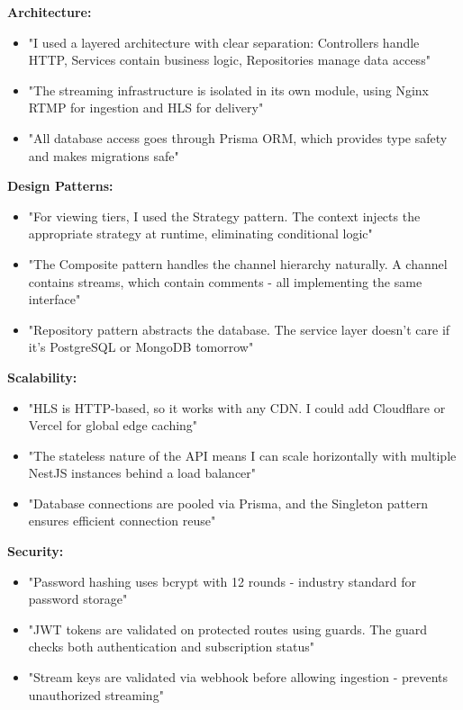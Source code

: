 \documentclass[10pt]{article}
\begin{document}
\noindent
\begin{tcolorbox}[
  colback=white,
  colframe=primary,
  arc=3pt,
  boxrule=1pt,
  before skip=8pt,
  after skip=8pt
]

\textbf{Architecture:}
\begin{itemize}
\item "I used a layered architecture with clear separation: Controllers handle HTTP, Services contain business logic, Repositories manage data access"
\item "The streaming infrastructure is isolated in its own module, using Nginx RTMP for ingestion and HLS for delivery"
\item "All database access goes through Prisma ORM, which provides type safety and makes migrations safe"
\end{itemize}

\textbf{Design Patterns:}
\begin{itemize}
\item "For viewing tiers, I used the Strategy pattern. The context injects the appropriate strategy at runtime, eliminating conditional logic"
\item "The Composite pattern handles the channel hierarchy naturally. A channel contains streams, which contain comments - all implementing the same interface"
\item "Repository pattern abstracts the database. The service layer doesn't care if it's PostgreSQL or MongoDB tomorrow"
\end{itemize}

\textbf{Scalability:}
\begin{itemize}
\item "HLS is HTTP-based, so it works with any CDN. I could add Cloudflare or Vercel for global edge caching"
\item "The stateless nature of the API means I can scale horizontally with multiple NestJS instances behind a load balancer"
\item "Database connections are pooled via Prisma, and the Singleton pattern ensures efficient connection reuse"
\end{itemize}

\textbf{Security:}
\begin{itemize}
\item "Password hashing uses bcrypt with 12 rounds - industry standard for password storage"
\item "JWT tokens are validated on protected routes using guards. The guard checks both authentication and subscription status"
\item "Stream keys are validated via webhook before allowing ingestion - prevents unauthorized streaming"
\end{itemize}

\end{tcolorbox}
\end{document}
